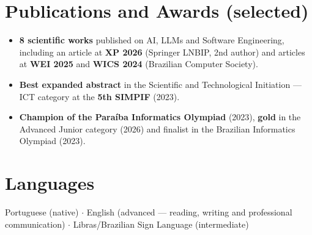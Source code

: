 \documentclass[10.5pt,a4paper]{article}
\begin{document}
\section*{Publications and Awards (selected)}
\begin{itemize}
  \item \textbf{8 scientific works} published on AI, LLMs and Software Engineering, including an
        article at \textbf{XP 2026} (Springer LNBIP, 2nd author) and articles at \textbf{WEI 2025}
        and \textbf{WICS 2024} (Brazilian Computer Society).
  \item \textbf{Best expanded abstract} in the Scientific and Technological Initiation --- ICT
        category at the \textbf{5th SIMPIF} (2023).
  \item \textbf{Champion of the Paraíba Informatics Olympiad} (2023), \textbf{gold} in the Advanced
        Junior category (2026) and finalist in the Brazilian Informatics Olympiad (2023).
\end{itemize}

\section*{Languages}
Portuguese (native) $\cdot$ English (advanced --- reading, writing and professional communication)
$\cdot$ Libras/Brazilian Sign Language (intermediate)
\end{document}

